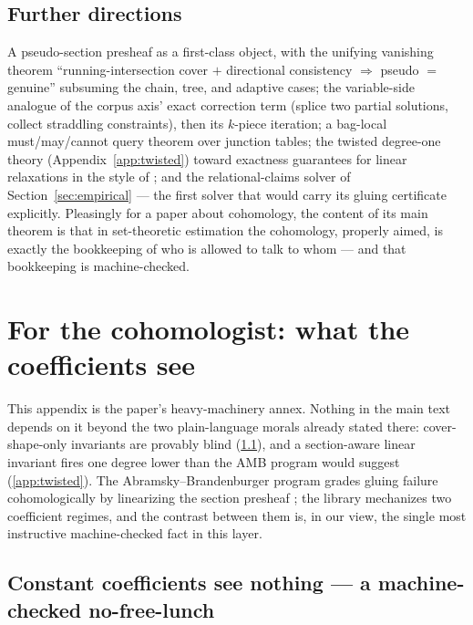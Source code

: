 \documentclass[11pt]{article}
\begin{document}
\subsection{Further directions}

A pseudo-section presheaf as a first-class object, with the unifying
vanishing theorem ``running-intersection cover $+$ directional
consistency $\Rightarrow$ pseudo $=$ genuine'' subsuming the chain,
tree, and adaptive cases; the variable-side analogue of the corpus
axis' exact correction term (splice two partial solutions, collect
straddling constraints), then its $k$-piece iteration; a bag-local
must/may/cannot query theorem over junction tables; the twisted
degree-one theory (Appendix~\ref{app:twisted}) toward exactness
guarantees for linear relaxations in the style of
\citet{abramsky2017contextualfraction}; and the relational-claims
solver of Section~\ref{sec:empirical} --- the first solver that
would carry its gluing certificate explicitly.  Pleasingly for a
paper about cohomology, the content of its main theorem is that in
set-theoretic estimation the cohomology, properly aimed, is exactly
the bookkeeping of who is allowed to talk to whom --- and that
bookkeeping is machine-checked.

\appendix

\section{For the cohomologist: what the coefficients see}
\label{app:coefficients}

This appendix is the paper's heavy-machinery annex.  Nothing in the
main text depends on it beyond the two plain-language morals already
stated there: cover-shape-only invariants are provably blind
(\ref{app:constant}), and a section-aware linear invariant fires one
degree lower than the AMB program would suggest (\ref{app:twisted}).
The Abramsky--Brandenburger program grades gluing failure
cohomologically by linearizing the section presheaf
\citep{abramsky2011sheaf,abramsky2012cohomology}; the library
mechanizes two coefficient regimes, and the contrast between them is,
in our view, the single most instructive machine-checked fact in
this layer.

\subsection{Constant coefficients see nothing --- a machine-checked
no-free-lunch}
\label{app:constant}
\end{document}

